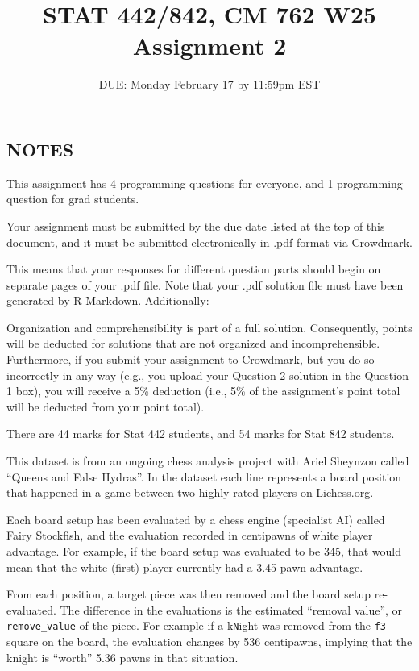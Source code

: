 \documentclass[
]{article}
\title{STAT 442/842, CM 762 W25 Assignment 2}
\subtitle{DUE: Monday February 17 by 11:59pm EST}
\author{}
\date{\vspace{-2.5em}}
\begin{document}
\maketitle

\subsection{NOTES}\label{notes}

This assignment has 4 programming questions for everyone, and 1
programming question for grad students.

Your assignment must be submitted by the due date listed at the top of
this document, and it must be submitted electronically in .pdf format
via Crowdmark.

This means that your responses for different question parts should begin
on separate pages of your .pdf file. Note that your .pdf solution file
must have been generated by R Markdown. Additionally:

Organization and comprehensibility is part of a full solution.
Consequently, points will be deducted for solutions that are not
organized and incomprehensible. Furthermore, if you submit your
assignment to Crowdmark, but you do so incorrectly in any way (e.g., you
upload your Question 2 solution in the Question 1 box), you will receive
a 5\% deduction (i.e., 5\% of the assignment's point total will be
deducted from your point total).

There are 44 marks for Stat 442 students, and 54 marks for Stat 842
students.

\newpage

This dataset is from an ongoing chess analysis project with Ariel
Sheynzon called ``Queens and False Hydras''. In the dataset each line
represents a board position that happened in a game between two highly
rated players on Lichess.org.

Each board setup has been evaluated by a chess engine (specialist AI)
called Fairy Stockfish, and the evaluation recorded in centipawns of
white player advantage. For example, if the board setup was evaluated to
be 345, that would mean that the white (first) player currently had a
3.45 pawn advantage.

From each position, a target piece was then removed and the board setup
re-evaluated. The difference in the evaluations is the estimated
``removal value'', or \texttt{remove\_value} of the piece. For example
if a k\texttt{N}ight was removed from the \texttt{f3} square on the
board, the evaluation changes by 536 centipawns, implying that the
knight is ``worth'' 5.36 pawns in that situation.
\end{document}
